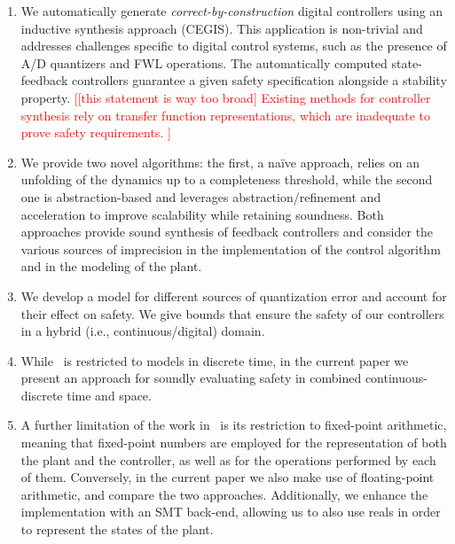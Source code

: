 \documentclass[twocolumn]{autart}    %
\renewcommand{\note}[1]{\textcolor{red}{[#1]}}
\begin{document}
\begin{enumerate}

\item We automatically generate \emph{correct-by-construction} digital
  controllers using an inductive synthesis approach (CEGIS).  
  This application is non-trivial and addresses challenges specific to digital control
  systems, such as the presence of A/D quantizers and FWL operations.  %
%
  The automatically computed state-feedback controllers 
  guarantee a given safety specification alongside a stability property. 
  \note{[this statement is way too broad] Existing methods for controller synthesis rely on transfer 
  function representations, which are inadequate to prove safety requirements. } 
%
\item We provide two novel algorithms: the first, a na\"ive approach, relies on 
  an unfolding of the dynamics up to a completeness threshold, while the
  second one is abstraction-based and leverages abstraction/refinement and
  acceleration to improve scalability while retaining soundness.  %
  Both approaches provide sound synthesis of 
  feedback controllers and consider the various sources of imprecision in
  the implementation of the control algorithm and in the modeling of the
  plant. 
%
\item We develop a model for different sources of quantization error and account for 
  their effect on safety.  We give bounds that ensure the
  safety of our controllers in a hybrid (i.e., continuous/digital) domain.

\item While~\cite{DBLP:conf/cav/AbateBCCDKKP17} is restricted to models in discrete time, in the current paper we present an approach for
  soundly evaluating safety in combined continuous-discrete time and space. 

\item A further limitation of the work in~\cite{DBLP:conf/cav/AbateBCCDKKP17} 
  is its restriction to fixed-point arithmetic, meaning that fixed-point
  numbers are employed for the representation of both the plant and the
  controller, as well as for the operations performed by each of them. 
  Conversely, in the current paper we also make use of floating-point
  arithmetic, and compare the two approaches.  Additionally, we enhance the
  implementation with an SMT back-end, allowing us to also use reals in order
  to represent the states of the plant. 

\end{enumerate}
  
\end{document}
